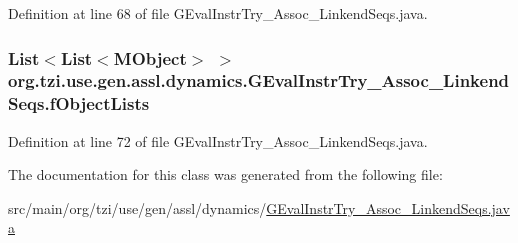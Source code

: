 Definition at line 68 of file G\-Eval\-Instr\-Try\-\_\-\-Assoc\-\_\-\-Linkend\-Seqs.\-java.

\hypertarget{classorg_1_1tzi_1_1use_1_1gen_1_1assl_1_1dynamics_1_1_g_eval_instr_try___assoc___linkend_seqs_a5a87f700fbb023a58aa4e0d338c13b85}{
\subsubsection[{f\-Object\-Lists}]{\setlength{\rightskip}{0pt plus 5cm}List$<$List$<${\bf M\-Object}$>$ $>$ org.\-tzi.\-use.\-gen.\-assl.\-dynamics.\-G\-Eval\-Instr\-Try\-\_\-\-Assoc\-\_\-\-Linkend\-Seqs.\-f\-Object\-Lists\hspace{0.3cm}{\ttfamily [protected]}}}\label{classorg_1_1tzi_1_1use_1_1gen_1_1assl_1_1dynamics_1_1_g_eval_instr_try___assoc___linkend_seqs_a5a87f700fbb023a58aa4e0d338c13b85}


Definition at line 72 of file G\-Eval\-Instr\-Try\-\_\-\-Assoc\-\_\-\-Linkend\-Seqs.\-java.



The documentation for this class was generated from the following file\-:\begin{DoxyCompactItemize}
\item 
src/main/org/tzi/use/gen/assl/dynamics/\hyperlink{_g_eval_instr_try___assoc___linkend_seqs_8java}{G\-Eval\-Instr\-Try\-\_\-\-Assoc\-\_\-\-Linkend\-Seqs.\-java}\end{DoxyCompactItemize}
